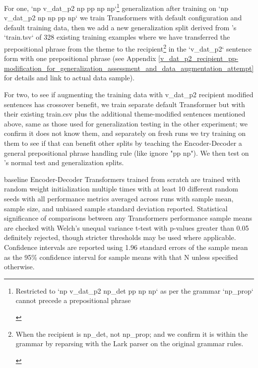 \documentclass[11pt]{article}
\begin{document}
For one, `np v\_dat\_p2 np pp np np`\footnote{\begin{footnotesize}Restricted to `np v\_dat\_p2 np\_det pp np np` as per the grammar `np\_prop` cannot precede a prepositional phrase\end{footnotesize}} generalization after training on `np v\_dat\_p2 np np pp np` we train \cite{Wu2023} Transformers with default configuration and default training data, then we add a new generalization split derived from \cite{Wu2023}'s `train.tsv` of 328 existing training examples where we have transferred the prepositional phrase from the theme to the recipient\footnote{\begin{footnotesize}When the recipient is np\_det, not np\_prop; and we confirm it is within the grammar by reparsing with the Lark parser on the original grammar rules.\end{footnotesize}} in the `v\_dat\_p2` sentence form with one prepositional phrase (see Appendix \ref{v_dat_p2_recipient_pp-modification_for_generalization_assessment_and_data_augmentation_attempt} for details and link to actual data sample).

For two, to see if augmenting the training data with v\_dat\_p2 recipient modified sentences has crossover benefit, we train separate default \cite{Wu2023} Transformer but with their existing train.csv plus the additional theme-modified sentences mentioned above, same as those used for generalization testing in the other experiment; we confirm it does not know them, and separately on fresh runs we try training on them to see if that can benefit other splits by teaching the Encoder-Decoder a general prepositional phrase handling rule (like ignore "pp np"). We then test on \cite{Wu2023}'s normal test and generalization splits.

\cite{Wu2023} baseline Encoder-Decoder Transformers trained from scratch are trained with random weight initialization multiple times with at least 10 different random seeds with all performance metrics averaged across runs with sample mean, sample size, and unbiased sample standard deviation reported. Statistical significance of comparisons between any Transformers performance sample means are checked with Welch's unequal variance t-test with p-values greater than 0.05 definitely rejected, though stricter thresholds may be used where applicable. Confidence intervals are reported using 1.96 standard errors of the sample mean as the 95\% confidence interval for sample means with that N unless specified otherwise.
\end{document}
